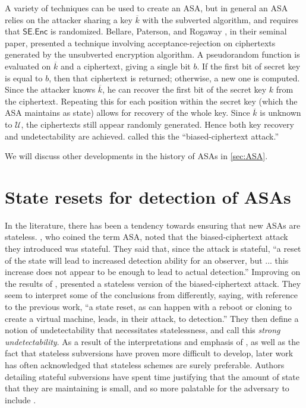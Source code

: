 A variety of techniques can be used to create an ASA, but in general an ASA relies on the attacker sharing a key $\overline{k}$ with the subverted algorithm, and requires that $\mathsf{SE.Enc}$ is randomized. Bellare, Paterson, and Rogaway \cite{C:BelPatRog14}, in their seminal paper, presented a technique involving acceptance-rejection on ciphertexts generated by the unsubverted encryption algorithm. A pseudorandom function is evaluated on $\overline{k}$ and a ciphertext, giving a single bit $b$. If the first bit of secret key is equal to $b$, then that ciphertext is returned; otherwise, a new one is computed. Since the attacker knows $\overline{k}$, he can recover the first bit of the secret key $k$ from the ciphertext. Repeating this for each position within the secret key (which the ASA maintains as state) allows for recovery of the whole key. Since $\overline{k}$ is unknown to $\mathcal{U}$, the ciphertexts still appear randomly generated. Hence both key recovery and undetectability are achieved. \cite{C:BelPatRog14} called this the ``biased-ciphertext attack.''

We will discuss other developments in the history of ASAs in \autoref{sec:ASA}.


\section{State resets for detection of ASAs}
In the literature, there has been a tendency towards ensuring that new ASAs are stateless. \cite{C:BelPatRog14}, who coined the term ASA, noted that the biased-ciphertext attack they introduced was stateful. They said that, since the attack is stateful, ``a reset of the state will lead to increased detection ability for an observer, but ... this increase does not appear to be enough to lead to actual detection.'' Improving on the results of \cite{C:BelPatRog14}, \cite{CCS:BelJaeKan15} presented a stateless version of the biased-ciphertext attack. They seem to interpret some of the conclusions from \cite{C:BelPatRog14} differently, saying, with reference to the previous work, ``a state reset, as can happen with a reboot or cloning to create a virtual machine, leads, in their attack, to detection.'' They then define a notion of undetectability that necessitates statelessness, and call this \emph{strong undetectability}. As a result of the interpretations and emphasis of \cite{CCS:BelJaeKan15}, as well as the fact that stateless subversions have proven more difficult to develop, later work has often acknowledged that stateless schemes are surely preferable. Authors detailing stateful subversions have spent time justifying that the amount of state that they are maintaining is small, and so more palatable for the adversary to include \cite{BSKC2019,AC:CheHuaYun20}.

